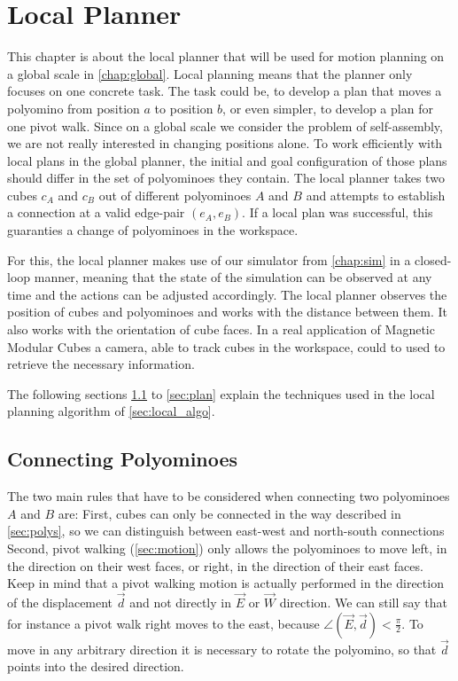 \chapter{Local Planner}
\label{chap:local}

This chapter is about the local planner that will be used for motion planning on a global scale in \autoref{chap:global}.
Local planning means that the planner only focuses on one concrete task.
The task could be, to develop a plan that moves a polyomino from position $a$ to position $b$, or even simpler, to develop a plan for one pivot walk.
Since on a global scale we consider the problem of self-assembly, we are not really interested in changing positions alone.
To work efficiently with local plans in the global planner, the initial and goal configuration of those plans should differ in the set of polyominoes they contain.
The local planner takes two cubes $c_A$ and $c_B$ out of different polyominoes $A$ and $B$ and attempts to establish a connection at a valid edge-pair $(e_A, e_B)$.
If a local plan was successful, this guaranties a change of polyominoes in the workspace.

For this, the local planner makes use of our simulator from \autoref{chap:sim} in a closed-loop manner, meaning that the state of the simulation can be observed at any time and the actions can be adjusted accordingly.
The local planner observes the position of cubes and polyominoes and works with the distance between them.
It also works with the orientation of cube faces.
In a real application of Magnetic Modular Cubes a camera, able to track cubes in the workspace, could to used to retrieve the necessary information. 

The following sections \ref{sec:connect} to \ref{sec:plan} explain the techniques used in the local planning algorithm of \autoref{sec:local_algo}.

\section{Connecting Polyominoes}
\label{sec:connect}

The two main rules that have to be considered when connecting two polyominoes $A$ and $B$ are:
First, cubes can only be connected in the way described in \autoref{sec:polys}, so we can distinguish between east-west and north-south connections
Second, pivot walking (\autoref{sec:motion}) only allows the polyominoes to move left, in the direction on their west faces, or right, in the direction of their east faces.
Keep in mind that a pivot walking motion is actually performed in the direction of the displacement $\vec{d}$ and not directly in $\vec{E}$ or $\vec{W}$ direction.
We can still say that for instance a pivot walk right moves to the east, because $\angle \left( \vec{E}, \vec{d} \right) < \frac{\pi}{2}$.
To move in any arbitrary direction it is necessary to rotate the polyomino, so that $\vec{d}$ points into the desired direction.

